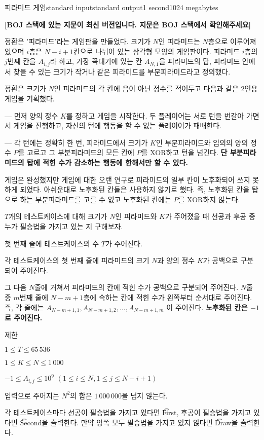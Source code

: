 \begin{problem}{피라미드 게임}{standard input}{standard output}{1 second}{1024 megabytes}

\textbf{[BOJ 스택에 있는 지문이 최신 버전입니다. 지문은 BOJ 스택에서 확인해주세요]}


정환은 '피라미드'라는 게임판을 만들었다. 크기가 $N$인 피라미드는 $N$층으로 이루어져 있으며 $i$층은 $N-i+1$칸으로 나뉘어 있는 삼각형 모양의 게임판이다. 피라미드 $i$층의 $j$번째 칸을 $A_{i,j}$라 하고, 가장 꼭대기에 있는 칸 $A_{N,1}$을 피라미드의 탑, 피라미드 안에서 찾을 수 있는 크기가 작거나 같은 피라미드를 부분피라미드라고 정의했다.

정환은 크기가 $N$인 피라미드의 각 칸에 음이 아닌 정수를 적어두고 다음과 같은 2인용 게임을 기획했다.

--- 먼저 양의 정수 $K$를 정하고 게임을 시작한다. 두 플레이어는 서로 턴을 번갈아 가면서 게임을 진행하고, 자신의 턴에 행동을 할 수 없는 플레이어가 패배한다.

--- 각 턴에는 정확히 한 번, 피라미드에서 크기가 $K$인 부분피라미드와 임의의 양의 정수 $P$를 고르고 그 부분피라미드의 모든 칸에 $P$를 XOR하고 턴을 넘긴다. \textbf{단 부분피라미드의 탑에 적힌 수가 감소하는 행동에 한해서만 할 수 있다.}

게임은 완성했지만 게임에 대한 오랜 연구로 피라미드의 일부 칸이 노후화되어 쓰지 못하게 되었다. 아쉬운대로 노후화된 칸들은 사용하지 않기로 했다. 즉, 노후화된 칸을 탑으로 하는 부분피라미드를 고를 수 없고 노후화된 칸에는 $P$를 XOR하지 않는다.

$T$개의 테스트케이스에 대해 크기가 $N$인 피라미드와 $K$가 주어졌을 때 선공과 후공 중 누가 필승법을 가지고 있는 지 구해보자.

\InputFile
첫 번째 줄에 테스트케이스의 수 $T$가 주어진다.

각 테스트케이스의 첫 번째 줄에 피라미드의 크기 $N$과 양의 정수 $K$가 공백으로 구분되어 주어진다.

그 다음 $N$줄에 거쳐서 피라미드의 칸에 적힌 수가 공백으로 구분되어 주어진다. $N$줄 중 $m$번째 줄에 $N-m+1$층에 속하는 칸에 적힌 수가 왼쪽부터 순서대로 주어진다. 즉, 각 줄에는 $A_{N-m+1,1},A_{N-m+1,2}, \dots ,A_{N-m+1,m}$ 이 주어진다. \textbf{노후화된 칸은 $-1$로 주어진다.}

제한

$1 \le T \le 65\,536$

$1 \le K \le N \le 1\,000$

$-1 \le A_{i,j} \le 10^9$ $(1 \le i \le N, 1 \le j \le N-i+1)$ 

입력으로 주어지는 $N^2$의 합은 $1\,000\,000$을 넘지 않는다.  

\OutputFile
각 테스트케이스마다 선공이 필승법을 가지고 있다면 \t{First}, 후공이 필승법을 가지고 있다면 \t{Second}을 출력한다. 만약 양쪽 모두 필승법을 가지고 있지 않다면 \t{Draw}을 출력한다.

\Example

\begin{example}
%
\end{example}

\end{problem}

